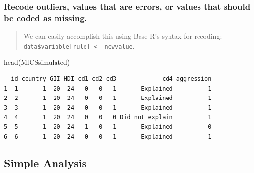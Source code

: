 \documentclass[
  letterpaper,
  DIV=11,
  numbers=noendperiod]{scrreprt}
\newenvironment{Shaded}{\begin{snugshade}}{\end{snugshade}}
\newcommand{\CommentTok}[1]{\textcolor[rgb]{0.37,0.37,0.37}{#1}}
\newcommand{\ConstantTok}[1]{\textcolor[rgb]{0.56,0.35,0.01}{#1}}
\newcommand{\DecValTok}[1]{\textcolor[rgb]{0.68,0.00,0.00}{#1}}
\newcommand{\FunctionTok}[1]{\textcolor[rgb]{0.28,0.35,0.67}{#1}}
\newcommand{\NormalTok}[1]{\textcolor[rgb]{0.00,0.23,0.31}{#1}}
\newcommand{\OtherTok}[1]{\textcolor[rgb]{0.00,0.23,0.31}{#1}}
\newcommand{\SpecialCharTok}[1]{\textcolor[rgb]{0.37,0.37,0.37}{#1}}
\begin{document}
\hypertarget{sec-recodes}{%
\subsubsection{Recode outliers, values that are errors, or values that
should be coded as missing.}\label{sec-recodes}}

\begin{quote}
We can easily accomplish this using Base R's syntax for recoding:
\texttt{data\$variable{[}rule{]}\ \textless{}-\ newvalue}.
\end{quote}

\begin{Shaded}
\end{Shaded}

\begin{Shaded}
\begin{Highlighting}[]
\FunctionTok{head}\NormalTok{(MICSsimulated)}
\end{Highlighting}
\end{Shaded}

\begin{verbatim}
  id country GII HDI cd1 cd2 cd3             cd4 aggression
1  1       1  20  24   0   0   1       Explained          1
2  2       1  20  24   0   0   1       Explained          1
3  3       1  20  24   0   0   1       Explained          1
4  4       1  20  24   0   0   0 Did not explain          1
5  5       1  20  24   1   0   1       Explained          0
6  6       1  20  24   0   0   1       Explained          1
\end{verbatim}

\hypertarget{simple-analysis}{%
\subsection{Simple Analysis}\label{simple-analysis}}
\end{document}

